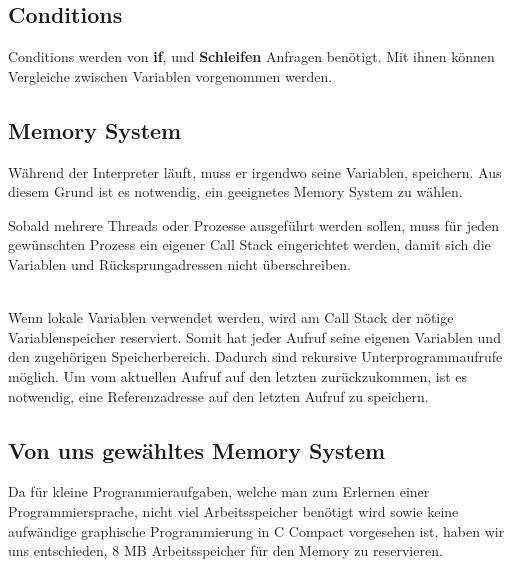 \subsection{Conditions}
Conditions werden von \textbf{if}, und \textbf{Schleifen} Anfragen benötigt. Mit ihnen können Vergleiche zwischen Variablen vorgenommen werden.



\subsection{Memory System}
\label{sec:memory_system}
Während der Interpreter läuft, muss er irgendwo seine Variablen, speichern. Aus diesem Grund ist es notwendig, ein geeignetes Memory System zu wählen.


Sobald mehrere Threads oder Prozesse ausgeführt werden sollen, muss für jeden gewünschten Prozess ein eigener Call Stack eingerichtet
werden, damit sich die Variablen und Rücksprungadressen nicht überschreiben.

\\
Wenn lokale Variablen verwendet werden, wird am Call Stack der nötige Variablenspeicher reserviert. Somit hat jeder Aufruf seine eigenen Variablen und den zugehörigen Speicherbereich. Dadurch sind rekursive Unterprogrammaufrufe möglich. Um vom aktuellen Aufruf auf den letzten zurückzukommen, ist es notwendig, eine Referenzadresse auf den letzten Aufruf zu speichern.

\subsection{Von uns gewähltes Memory System}
Da für kleine Programmieraufgaben, welche man zum Erlernen einer Programmiersprache, nicht viel Arbeitsspeicher benötigt wird sowie keine aufwändige graphische Programmierung in C Compact vorgesehen ist, haben wir uns entschieden, 8 MB Arbeitsspeicher für den Memory zu reservieren.

